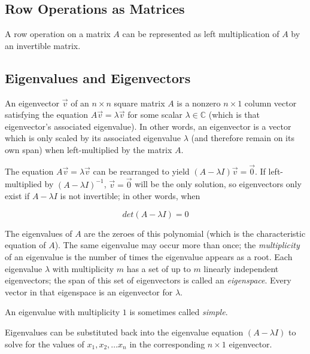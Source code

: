 \documentclass[12pt]{article}
\begin{document}
	
	
	\subsection{Row Operations as Matrices}
	
	A row operation on a matrix $A$ can be represented as left multiplication of $A$ by an invertible matrix.

	\subsection{Eigenvalues and Eigenvectors}
	
	An eigenvector $\vec{v}$ of an $n\times n$ square matrix $A$ is a nonzero $n\times 1$ column vector satisfying the equation $A\vec{v} =\lambda\vec{v}$ for some scalar $\lambda \in \mathbb{C}$ (which is that eigenvector's associated eigenvalue). In other words, an eigenvector is a vector which is only scaled by its associated eigenvalue $\lambda$ (and therefore remain on its own span) when left-multiplied by the matrix $A$.
	
	The equation $A\vec{v} = \lambda\vec{v}$ can be rearranged to yield $(A - \lambda I)\vec{v} = \vec{0}$. If left-multiplied by $(A - \lambda I)^{-1}$, $\vec{v}=\vec{0}$ will be the only solution, so eigenvectors only exist if $A - \lambda I$ is not invertible; in other words, when
	
	$$det(A-\lambda I) = 0$$


	The eigenvalues of $A$ are the zeroes of this polynomial (which is the characteristic equation of $A$). The same eigenvalue may occur more than once; the \textit{multiplicity} of an eigenvalue is the number of times the eigenvalue appears as a root. Each eigenvalue $\lambda$ with multiplicity $m$ has a set of up to $m$ linearly independent eigenvectors; the span of this set of eigenvectors is called an \textit{eigenspace}. Every vector in that eigenspace is an eigenvector for $\lambda$. 
	
	 An eigenvalue with multiplicity $1$ is sometimes called \textit{simple}.

	Eigenvalues can be substituted back into the eigenvalue equation $(A-\lambda I)$ to solve for the values of $x_{1}, x_{2}, \ldots x_{n}$ in the corresponding $n \times 1$ eigenvector.
	
\end{document}
